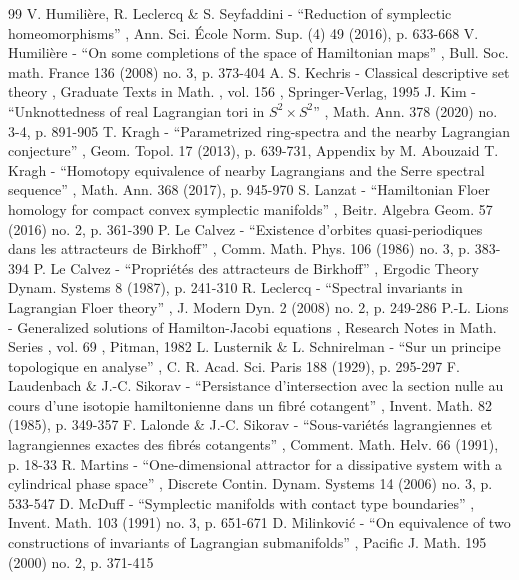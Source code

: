 \documentclass[10pt]{amsart}
\theoremstyle{definition}
\begin{document}
\begin{thebibliography}{99}
 V. Humilière, R. Leclercq \& S. Seyfaddini - “Reduction of symplectic homeomorphisms” , Ann. Sci. École Norm. Sup. (4) 49 (2016), p. 633-668
 V. Humilière - “On some completions of the space of Hamiltonian maps” , Bull. Soc. math. France 136 (2008) no. 3, p. 373-404
 A. S. Kechris - Classical descriptive set theory , Graduate Texts in Math. , vol. 156 , Springer-Verlag, 1995
 J. Kim - “Unknottedness of real Lagrangian tori in $S^2 \times S^2$” , Math. Ann. 378 (2020) no. 3-4, p. 891-905
 T. Kragh - “Parametrized ring-spectra and the nearby Lagrangian conjecture” , Geom. Topol. 17 (2013), p. 639-731, Appendix by M. Abouzaid
 T. Kragh - “Homotopy equivalence of nearby Lagrangians and the Serre spectral sequence” , Math. Ann. 368 (2017), p. 945-970
 S. Lanzat - “Hamiltonian Floer homology for compact convex symplectic manifolds” , Beitr. Algebra Geom. 57 (2016) no. 2, p. 361-390
 P. Le Calvez - “Existence d’orbites quasi-periodiques dans les attracteurs de Birkhoff” , Comm. Math. Phys. 106 (1986) no. 3, p. 383-394
 P. Le Calvez - “Propriétés des attracteurs de Birkhoff” , Ergodic Theory Dynam. Systems 8 (1987), p. 241-310
 R. Leclercq - “Spectral invariants in Lagrangian Floer theory” , J. Modern Dyn. 2 (2008) no. 2, p. 249-286
 P.-L. Lions - Generalized solutions of Hamilton-Jacobi equations , Research Notes in Math. Series , vol. 69 , Pitman, 1982
 L. Lusternik \& L. Schnirelman - “Sur un principe topologique en analyse” , C. R. Acad. Sci. Paris 188 (1929), p. 295-297
 F. Laudenbach \& J.-C. Sikorav - “Persistance d’intersection avec la section nulle au cours d’une isotopie hamiltonienne dans un fibré cotangent” , Invent. Math. 82 (1985), p. 349-357
 F. Lalonde \& J.-C. Sikorav - “Sous-variétés lagrangiennes et lagrangiennes exactes des fibrés cotangents” , Comment. Math. Helv. 66 (1991), p. 18-33
 R. Martins - “One-dimensional attractor for a dissipative system with a cylindrical phase space” , Discrete Contin. Dynam. Systems 14 (2006) no. 3, p. 533-547
 D. McDuff - “Symplectic manifolds with contact type boundaries” , Invent. Math. 103 (1991) no. 3, p. 651-671
 D. Milinković - “On equivalence of two constructions of invariants of Lagrangian submanifolds” , Pacific J. Math. 195 (2000) no. 2, p. 371-415

\end{thebibliography}
\end{document}
